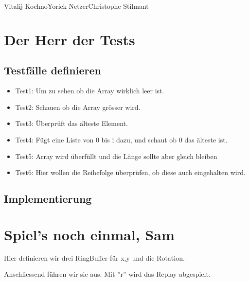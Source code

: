 \documentclass{pi1}
\begin{document}
          {Vitalij Kochno}{Yorick Netzer}{Christophe Stilmant}

\section{Der Herr der Tests}
\subsection{Testf\"alle definieren}



\begin{itemize}
	\item Test1: Um zu sehen ob die Array wirklich leer ist.
	\item Test2: Schauen ob die Array gr\"osser wird.
	\item Test3: \"Uberpr\"uft das \"alteste Element.
	\item Test4: F\"ugt eine Liste von 0 bis i dazu, und schaut ob 0 das \"alteste ist.
	\item Test5: Array wird \"uberf\"ullt und die L\"ange sollte aber gleich bleiben
	\item Test6: Hier wollen die Reihefolge \"uberpr\"ufen, ob diese auch eingehalten wird. 
\end{itemize}

\subsection{Implementierung}



\section{Spiel's noch einmal, Sam}
Hier definieren wir drei RingBuffer f\"ur x,y und die Rotation.



Anschliessend f\"uhren wir sie aus. Mit ''r'' wird das Replay abgespielt.


	
\end{document}
